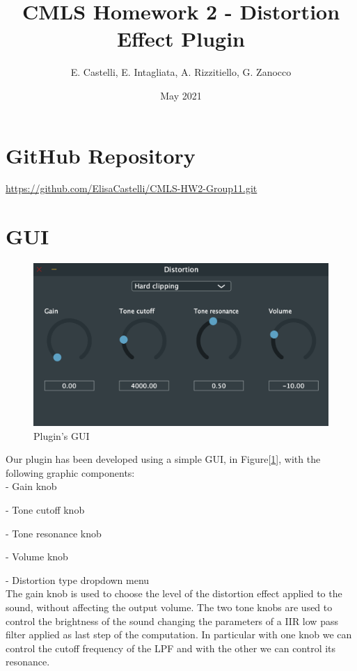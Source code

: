 \documentclass[letterpaper, 12pt]{article}
\begin{document}
	
	\title{CMLS Homework 2 - Distortion Effect Plugin}
	\author{E. Castelli, E. Intagliata, A. Rizzitiello, G. Zanocco}
	\date{May 2021}
	\maketitle
	
	\section{GitHub Repository}
	\url{https://github.com/ElisaCastelli/CMLS-HW2-Group11.git}
	
	\section{GUI}
	
	\begin{figure}[h!]
		\includegraphics[scale=0.7]{gui.png}
		\centering
		\caption{Plugin's GUI}
		\label{fig:gui}
	\end{figure}

	Our plugin has been developed using a simple GUI, in Figure[\ref{fig:gui}], with the following graphic components:
	\\
	
	
	-	Gain knob 
	
	-	Tone cutoff knob 
	
	-	Tone resonance knob
	
	-	Volume knob
	
	-	Distortion type dropdown menu
	\\
	
	
	The gain knob is used to choose the level of the distortion effect applied to the sound, without affecting the output volume.
	The two tone knobs are used to control the brightness of the sound changing the parameters of a IIR low pass filter applied as last step of the computation. In particular with one knob we can control the cutoff frequency of the LPF and with the other we can control its resonance. 
	
\end{document}
